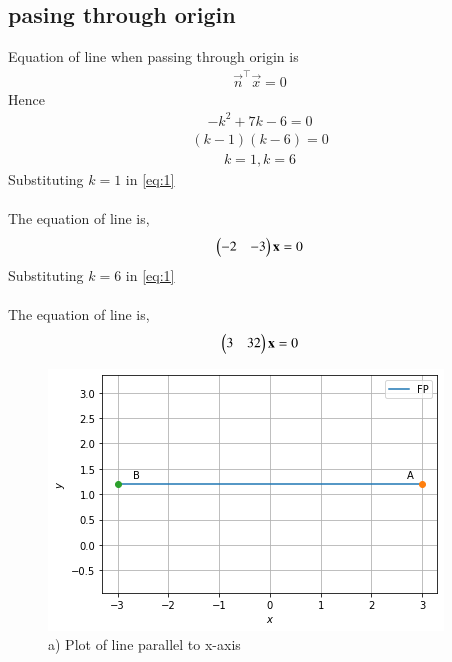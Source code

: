 \documentclass[journal,12pt,twocolumn]{IEEEtran}
\begin{document}
\subsection{pasing through origin}
Equation of line when passing through origin is 
\begin{align}
\vec{n}^\top\vec{x}=0
\end{align}
Hence
\begin{align}
    -k^2+7k-6=0
\end{align}
\begin{align}
     (k-1)(k-6)=0
\end{align}
\begin{align}
    k=1, k=6
\end{align}
Substituting $k=1$ in \eqref{eq:1}\\
\\
The equation of line is,
\begin{align}
\begin{pmatrix}-2&-3\end{pmatrix}\mathbf{x} = 0
\end{align}
Substituting $k=6$ in \eqref{eq:1}\\
\\
The equation of line is,
\begin{align}
  \begin{pmatrix}3 & 32\end{pmatrix}\mathbf{x} = 0
\end{align}
\begin{figure}[!h]
         \centering
         \includegraphics[width=\columnwidth]{parallel to x axis.png}
         \caption{a) Plot of line parallel to x-axis}
         \label{Figure}
\end{figure}
\end{document}
